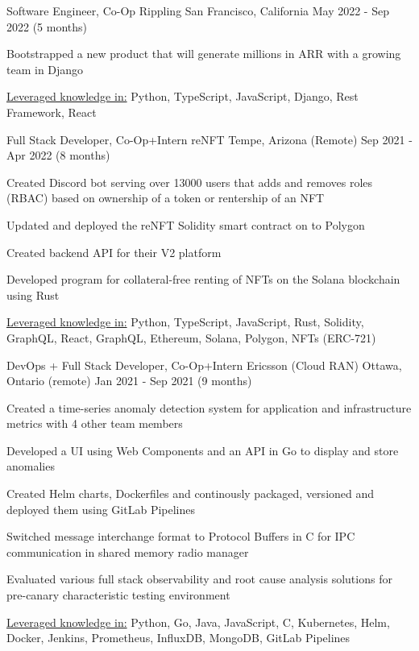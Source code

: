 \begin{cventries}
	\cventry
	{Software Engineer, Co-Op}
	{Rippling}
	{San Francisco, California}
	{May 2022 - Sep 2022 (5 months)}
	{
		\begin{cvitems}
			\item{Bootstrapped a new product that will generate millions in ARR with a growing team in Django}
			\item{\underline{Leveraged knowledge in:} Python, TypeScript, JavaScript, Django, Rest Framework, React}
		\end{cvitems}
	}
	\cventry
	{Full Stack Developer, Co-Op+Intern}
	{reNFT}
	{Tempe, Arizona (Remote)}
	{Sep 2021 - Apr 2022 (8 months)}
	{
		\begin{cvitems}
			\item{Created Discord bot serving over 13000 users that adds and removes roles (RBAC) based on ownership of a token or rentership of an NFT}
			\item{Updated and deployed the reNFT Solidity smart contract on to Polygon}
			\item{Created backend API for their V2 platform}
			\item{Developed program for collateral-free renting of NFTs on the Solana blockchain using Rust}
			\item{\underline{Leveraged knowledge in:} Python, TypeScript, JavaScript, Rust, Solidity, GraphQL, React, GraphQL, Ethereum, Solana, Polygon, NFTs (ERC-721)}
		\end{cvitems}
	}
	\cventry
	{DevOps + Full Stack Developer, Co-Op+Intern}
	{Ericsson (Cloud RAN)}
	{Ottawa, Ontario (remote)}
	{Jan 2021 - Sep 2021 (9 months)}
	{
		\begin{cvitems}
			\item{Created a time-series anomaly detection system for application and infrastructure metrics with 4 other team members}
			\item{Developed a UI using Web Components and an API in Go to display and store anomalies}
			\item{Created Helm charts, Dockerfiles and continously packaged, versioned and deployed them using GitLab Pipelines}
			\item{Switched message interchange format to Protocol Buffers in C for IPC communication in shared memory radio manager}
			\item{Evaluated various full stack observability and root cause analysis solutions for pre-canary characteristic testing environment}
			\item{\underline{Leveraged knowledge in:} Python, Go, Java, JavaScript, C, Kubernetes, Helm, Docker, Jenkins, Prometheus, InfluxDB, MongoDB, GitLab Pipelines}

\end{cvitems}}
\end{cventries}
